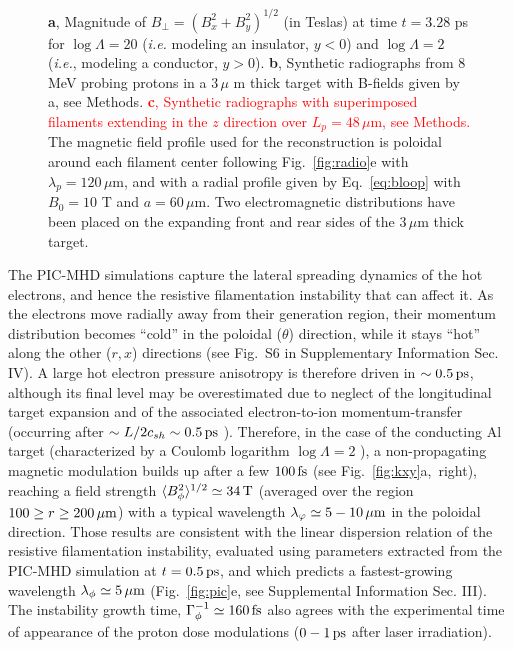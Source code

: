 \documentclass[aps,twocolumn,showpacs,superscriptaddress]{revtex4}
\begin{document}
\begin{figure}
{\textbf{a}, Magnitude of $B_\perp=(B_x^2+B_y^2)^{1/2}$ (in Teslas) at time $t=3.28$ ps for $\log \Lambda=20$ (\emph{i.e.} modeling an insulator, $y<0$) and $\log\Lambda=2$ (\emph{i.e.}, modeling a conductor, $y>0$).
\textbf{b}, Synthetic radiographs from $8$ MeV probing protons in a 
$3\, \mu$ m thick target with B-fields given by a, see Methods.
\textcolor{red}{
\textbf{c}, Synthetic radiographs with superimposed filaments extending in the $z$ direction over $L_p = 48\,\mu$m, see Methods.} 
The magnetic field profile used for the reconstruction is poloidal around each filament center following Fig.~\ref{fig:radio}e with $\lambda_p = 120\, \mu$m, and with a radial profile given by Eq.~\eqref{eq:bloop} with $B_0=10$ T and $a = 60\, \mu$m. Two electromagnetic distributions have been placed on the expanding front and rear sides of the $3\,\mu$m thick target.
}
\end{figure}

The PIC-MHD simulations capture the lateral spreading dynamics of the hot electrons, and hence the resistive filamentation instability that can affect it. As the electrons move radially away from their generation region, their momentum distribution becomes ``cold'' in the poloidal ($\theta$) direction, while it stays ``hot'' along the other ($r,x$) directions (see Fig.~S6 in Supplementary Information Sec. IV). A large hot electron pressure anisotropy is therefore driven in $\sim 0.5\,\rm ps$, although its final level may be overestimated due to neglect of the longitudinal target expansion and of the associated electron-to-ion momentum-transfer (occurring after $\sim L/2c_{sh} \sim 0.5\,\rm ps$ \cite{PRE_Mora_2005}). Therefore, in the case of the conducting Al target (characterized by a Coulomb logarithm $\log \Lambda = 2$ \cite{POF_Lee_1984}), a non-propagating magnetic modulation builds up after a few $100\,\rm fs$ (see \mbox{Fig.~\ref{fig:kxy}a, right}), reaching a field strength $\langle B_\phi^2\rangle^{1/2}\simeq 34\,\rm T$ (averaged over the region $100 \ge r \ge 200\,\mu \rm m$) with a typical wavelength $\lambda_\varphi \simeq 5-10\,\rm \mu m$  in the poloidal direction. Those results are consistent with the linear dispersion relation of the resistive filamentation instability, evaluated using parameters extracted from the PIC-MHD simulation at $t=0.5\,\rm ps$, and which predicts a fastest-growing wavelength $\lambda_\phi \simeq 5\,\mu \rm m$ (Fig.~\ref{fig:pic}e, see Supplemental Information Sec. III). The instability growth time, $\Gamma_\phi^{-1}\simeq 160\,\rm fs$ also agrees with the experimental time of appearance of the proton dose modulations ($0-1\,\rm ps$ after laser irradiation).
\end{document}
